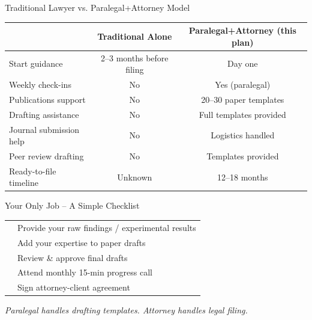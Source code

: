 \documentclass[aspectratio=169, 10pt]{beamer}
\begin{document}
	\begin{frame}{Traditional Lawyer vs. Paralegal+Attorney Model}
		\begin{table}
			\centering
			\scriptsize
			\begin{tabular}{lcc}
				\toprule
				& \textbf{Traditional Alone} & \textbf{Paralegal+Attorney (this plan)} \\
				\midrule
				Start guidance & 2--3 months before filing & Day one \\
				Weekly check-ins & No & Yes (paralegal) \\
				Publications support & No & 20--30 paper templates \\
				Drafting assistance & No & Full templates provided \\
				Journal submission help & No & Logistics handled \\
				Peer review drafting & No & Templates provided \\
				Ready-to-file timeline & Unknown & 12--18 months \\
				\bottomrule
			\end{tabular}
		\end{table}
	\end{frame}
	
	\begin{frame}{Your Only Job -- A Simple Checklist}
		\centering
		\large
		\begin{tabular}{p{0.8cm}p{8cm}}
			\faCheckSquare & Provide your raw findings / experimental results \\
			\faCheckSquare & Add your expertise to paper drafts \\
			\faCheckSquare & Review \& approve final drafts \\
			\faCheckSquare & Attend monthly 15-min progress call \\
			\faCheckSquare & Sign attorney-client agreement \\
		\end{tabular}
		
		\vspace{0.5cm}
		
		\vspace{0.3cm}
		\textit{Paralegal handles drafting templates. Attorney handles legal filing.}
	\end{frame}
	
\end{document}
